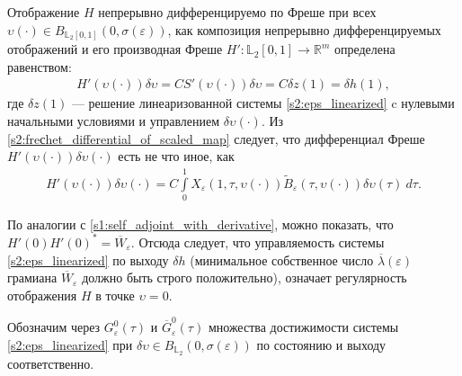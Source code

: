 \documentclass[../main.tex]{subfiles}
\begin{document}
Отображение $ H $ непрерывно дифференцируемо по Фреше при всех $ \upsilon(\cdot) \in B_{\mathbb{L}_2[0,1]}(0,\sigma(\varepsilon)) $, как композиция непрерывно дифференцируемых отображений и его производная Фреше $ H': \mathbb{L}_2[0,1] \rightarrow \mathbb{R}^m $ определена равенством:
\begin{gather*}
	H'( \upsilon(\cdot))\delta \upsilon = C S'(\upsilon(\cdot))\delta \upsilon = C \delta z(1) = \delta h(1),
\end{gather*}
где $ \delta z(1) $ --- решение линеаризованной системы \eqref{s2:eps_linearized} c нулевыми начальными условиями и управлением $ \delta \upsilon(\cdot) $. 
 Из \eqref{s2:freсhet_differential_of_scaled_map} следует, что дифференциал Фреше $ H'(\upsilon(\cdot)) \delta \upsilon(\cdot) $ есть не что иное, как
\begin{gather*}
	H'(\upsilon(\cdot)) \delta \upsilon(\cdot) = C \int\limits_0^1 X_{\varepsilon}(1,\tau, \upsilon(\cdot)) \widetilde{B}_{\varepsilon} (\tau, \upsilon(\cdot)) \delta \upsilon(\tau) \ d \tau.
\end{gather*}

По аналогии с \eqref{s1:self_adjoint_with_derivative}, можно показать, что $ H'(0) H'(0)^* = \overline{W}_{\varepsilon}$. 
Отсюда следует, что управляемость системы \eqref{s2:eps_linearized} по выходу $\delta h$ (минимальное собственное число $\overline{\lambda}(\varepsilon)$ грамиана $ \overline{W}_{\varepsilon}$ должно быть строго положительно), означает регулярность отображения $H$ в точке $\upsilon = 0$.

Обозначим через $G^0_{\varepsilon}(\tau)$ и $\overline{G}^0_{\varepsilon}(\tau)$ множества достижимости системы \eqref{s2:eps_linearized} при $\delta \upsilon \in B_{\mathbb{L}_2}(0, \sigma(\varepsilon))$ по состоянию и выходу соответственно.
\end{document}
